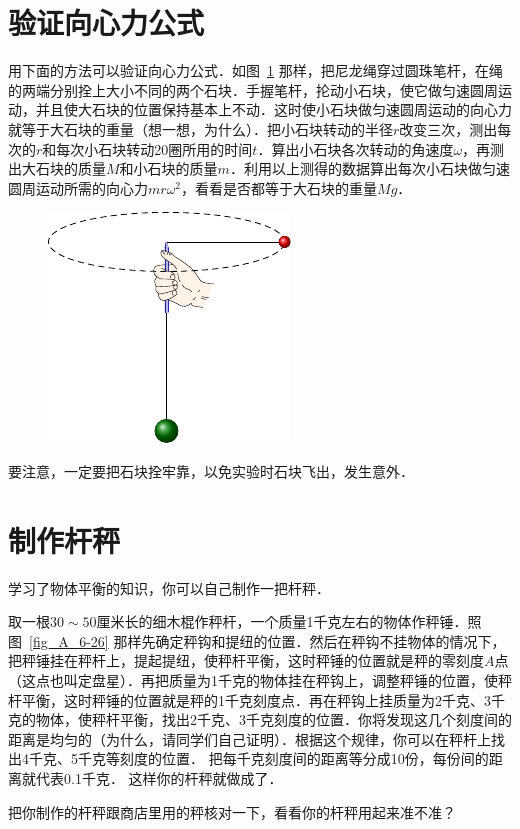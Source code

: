 \section{验证向心力公式}
用下面的方法可以验证向心力公式．如图~\ref{fig_A_10-23} 那样，把尼龙绳穿过圆珠笔杆，在绳的两端分别拴上大小不同的两个石块．手握笔杆，抡动小石块，使它做匀速圆周运动，并且使大石块的位置保持基本上不动．这时使小石块做匀速圆周运动的向心力就等于大石块的重量（想一想，为什么）．把小石块转动的半径$r$改变三次，测出每次的$r$和每次小石块转动20圈所用的时间$t$．算出小石块各次转动的角速度$\omega$，再测出大石块的质量$M$和小石块的质量$m$．利用以上测得的数据算出每次小石块做匀速圆周运动所需的向心力$mr\omega^2$，看看是否都等于大石块的重量$Mg$．
\begin{figure}[htbp]
    \centering
    \includegraphics{fig/A/10-23.pdf}
    \caption{}\label{fig_A_10-23}
\end{figure}

要注意，一定要把石块拴牢靠，以免实验时石块飞出，发生意外．

\section{制作杆秤}
学习了物体平衡的知识，你可以自己制作一把杆秤．

取一根$30 \sim 50$厘米长的细木棍作秤杆，一个质量1千克左右的物体作秤锤．照图~\ref{fig_A_6-26} 那样先确定秤钩和提纽的位置．然后在秤钩不挂物体的情况下，把秤锤挂在秤杆上，提起提纽，使秤杆平衡，这时秤锤的位置就是秤的零刻度$A$点（这点也叫定盘星）．再把质量为1千克的物体挂在秤钩上，调整秤锤的位置，使秤杆平衡，这时秤锤的位置就是秤的1千克刻度点．再在秤钩上挂质量为2千克、3千克的物体，使秤杆平衡，找出2千克、3千克刻度的位置．你将发现这几个刻度间的距离是均匀的（为什么，请同学们自己证明）．根据这个规律，你可以在秤杆上找出4千克、5千克等刻度的位置．
把每千克刻度间的距离等分成10份，每份间的距离就代表0.1千克．
这样你的杆秤就做成了．

把你制作的杆秤跟商店里用的秤核对一下，看看你的杆秤用起来准不准？

